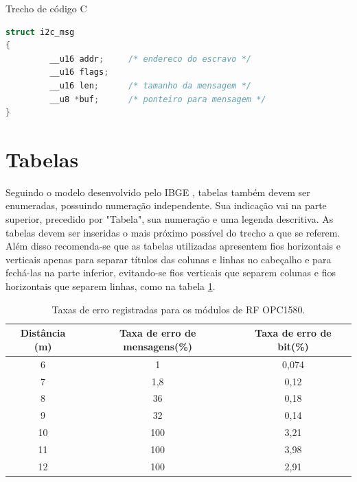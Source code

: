 \documentclass[repeatfields,xlists,xpacks,oneside,yearsonly]{ufrgscca}
\begin{document}
\begin{appendix}
\begin{codelist}[htbp]
\caption{Trecho de código C}
\label{code01}
\begin{lstlisting}[language=C]
struct i2c_msg
{
         __u16 addr;     /* endereco do escravo */
         __u16 flags;
         __u16 len;      /* tamanho da mensagem */
         __u8 *buf;      /* ponteiro para mensagem */
}
\end{lstlisting}
{}
\end{codelist}



\section{Tabelas}

Seguindo o modelo desenvolvido pelo IBGE \cite{IBGE:tabular-1993}, tabelas também devem ser enumeradas, possuindo numeração independente. Sua
indicação vai na parte superior, precedido por "Tabela", sua numeração e uma
legenda descritiva. As tabelas devem ser inseridas o
mais próximo possível do trecho a que se referem.
 Além disso recomenda-se que as tabelas utilizadas apresentem fios
horizontais e verticais apenas para separar títulos das colunas e linhas no
cabeçalho e para fechá-las na parte inferior, evitando-se fios verticais que
separem colunas e fios horizontais que separem linhas, como na tabela \ref{standarttable}.

\begin{table}[htb]
 \begin{center}
  \caption{Taxas de erro registradas para os módulos de RF OPC1580.}\label{standarttable}
  \begin{tabular}{c|cc}
  \hline
  Distância (m) & Taxa de erro de mensagens(\%) & Taxa de erro de bit(\%)\\
  \hline
  6	& 1 	& 0,074\\
  7	& 1,8	& 0,12\\
  8 	& 36  	& 0,18\\
  9	& 32  	& 0,14\\
  10	& 100	& 3,21\\
  11	& 100	& 3,98\\
  12	& 100	& 2,91\\
  \hline
  \end{tabular}
 \end{center}
{}
\end{table}


\end{appendix}
\end{document}
